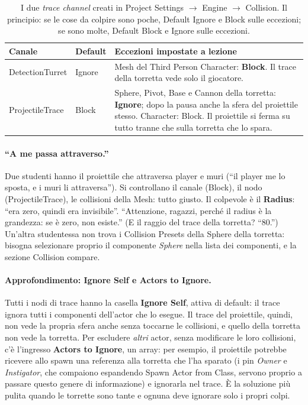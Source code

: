 \begin{table}[htbp]
\centering
\small
\begin{tabular}{@{}p{2.8cm}p{2.1cm}p{9.1cm}@{}}
\toprule
\textbf{Canale} & \textbf{Default} & \textbf{Eccezioni impostate a lezione} \\
\midrule
DetectionTurret & Ignore & Mesh del Third Person Character: \textbf{Block}. Il trace
della torretta vede solo il giocatore. \\
ProjectileTrace & Block & Sphere, Pivot, Base e Cannon della torretta: \textbf{Ignore};
dopo la pausa anche la sfera del proiettile stesso. Character: Block. Il proiettile si
ferma su tutto tranne che sulla torretta che lo spara. \\
\bottomrule
\end{tabular}
\caption{I due \emph{trace channel} creati in Project Settings $\rightarrow$ Engine
$\rightarrow$ Collision. Il principio: se le cose da colpire sono poche, Default
Ignore e Block sulle eccezioni; se sono molte, Default Block e Ignore sulle eccezioni.}
\label{ue5:tab:canali}
\end{table}

\paragraph{``A me passa attraverso.''} Due studenti hanno il proiettile che attraversa
player e muri (``il player me lo sposta, e i muri li attraversa''). Si controllano il
canale (Block), il nodo (ProjectileTrace), le collisioni della Mesh: tutto giusto. Il
colpevole è il \textbf{Radius}: ``era zero, quindi era invisibile''. ``Attenzione,
ragazzi, perché il radius è la grandezza: se è zero, non esiste.'' (E il raggio del
trace della torretta? ``80.'') Un'altra studentessa non trova i Collision Presets della
Sphere della torretta: bisogna selezionare proprio il componente \emph{Sphere} nella
lista dei componenti, e la sezione Collision compare.

\paragraph{Approfondimento: Ignore Self e Actors to Ignore.} Tutti i nodi di trace hanno
la casella \textbf{Ignore Self}, attiva di default: il trace ignora tutti i componenti
dell'actor che lo esegue. Il trace del proiettile, quindi, non vede la propria sfera
anche senza toccarne le collisioni, e quello della torretta non vede la torretta. Per
escludere \emph{altri} actor, senza modificare le loro collisioni, c'è l'ingresso
\textbf{Actors to Ignore}, un array: per esempio, il proiettile potrebbe ricevere allo
spawn una referenza alla torretta che l'ha sparato (i pin \emph{Owner} e \emph{Instigator}, che compaiono espandendo
Spawn Actor from Class, servono proprio a passare questo genere di informazione) e ignorarla nel trace. È la soluzione più pulita quando le torrette sono tante e
ognuna deve ignorare solo i propri colpi.

